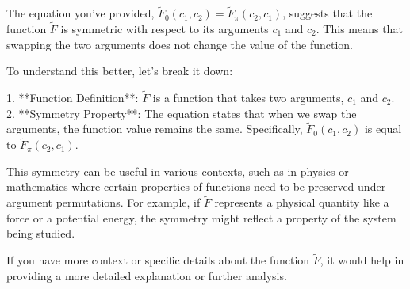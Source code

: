 The equation you've provided, $\widetilde{F}_{0}(c_{1},c_{2})=\widetilde{F}_{\pi}(c_{2},c_{1})$, suggests that the function $\widetilde{F}$ is symmetric with respect to its arguments $c_1$ and $c_2$. This means that swapping the two arguments does not change the value of the function.

To understand this better, let's break it down:

1. **Function Definition**: $\widetilde{F}$ is a function that takes two arguments, $c_1$ and $c_2$.
2. **Symmetry Property**: The equation states that when we swap the arguments, the function value remains the same. Specifically, $\widetilde{F}_{0}(c_{1},c_{2})$ is equal to $\widetilde{F}_{\pi}(c_{2},c_{1})$.

This symmetry can be useful in various contexts, such as in physics or mathematics where certain properties of functions need to be preserved under argument permutations. For example, if $\widetilde{F}$ represents a physical quantity like a force or a potential energy, the symmetry might reflect a property of the system being studied.

If you have more context or specific details about the function $\widetilde{F}$, it would help in providing a more detailed explanation or further analysis.